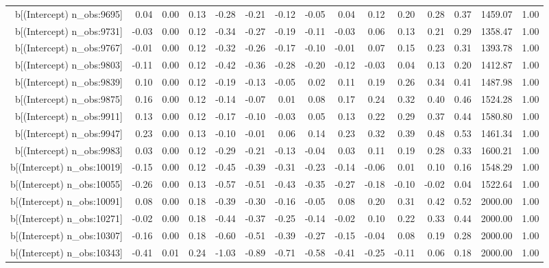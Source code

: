 \begin{table}[ht]
\begin{tabular}{rrrrrrrrrrrrrrr}
  b[(Intercept) n\_obs:9695] & 0.04 & 0.00 & 0.13 & -0.28 & -0.21 & -0.12 & -0.05 & 0.04 & 0.12 & 0.20 & 0.28 & 0.37 & 1459.07 & 1.00 \\ 
  b[(Intercept) n\_obs:9731] & -0.03 & 0.00 & 0.12 & -0.34 & -0.27 & -0.19 & -0.11 & -0.03 & 0.06 & 0.13 & 0.21 & 0.29 & 1358.47 & 1.00 \\ 
  b[(Intercept) n\_obs:9767] & -0.01 & 0.00 & 0.12 & -0.32 & -0.26 & -0.17 & -0.10 & -0.01 & 0.07 & 0.15 & 0.23 & 0.31 & 1393.78 & 1.00 \\ 
  b[(Intercept) n\_obs:9803] & -0.11 & 0.00 & 0.12 & -0.42 & -0.36 & -0.28 & -0.20 & -0.12 & -0.03 & 0.04 & 0.13 & 0.20 & 1412.87 & 1.00 \\ 
  b[(Intercept) n\_obs:9839] & 0.10 & 0.00 & 0.12 & -0.19 & -0.13 & -0.05 & 0.02 & 0.11 & 0.19 & 0.26 & 0.34 & 0.41 & 1487.98 & 1.00 \\ 
  b[(Intercept) n\_obs:9875] & 0.16 & 0.00 & 0.12 & -0.14 & -0.07 & 0.01 & 0.08 & 0.17 & 0.24 & 0.32 & 0.40 & 0.46 & 1524.28 & 1.00 \\ 
  b[(Intercept) n\_obs:9911] & 0.13 & 0.00 & 0.12 & -0.17 & -0.10 & -0.03 & 0.05 & 0.13 & 0.22 & 0.29 & 0.37 & 0.44 & 1580.80 & 1.00 \\ 
  b[(Intercept) n\_obs:9947] & 0.23 & 0.00 & 0.13 & -0.10 & -0.01 & 0.06 & 0.14 & 0.23 & 0.32 & 0.39 & 0.48 & 0.53 & 1461.34 & 1.00 \\ 
  b[(Intercept) n\_obs:9983] & 0.03 & 0.00 & 0.12 & -0.29 & -0.21 & -0.13 & -0.04 & 0.03 & 0.11 & 0.19 & 0.28 & 0.33 & 1600.21 & 1.00 \\ 
  b[(Intercept) n\_obs:10019] & -0.15 & 0.00 & 0.12 & -0.45 & -0.39 & -0.31 & -0.23 & -0.14 & -0.06 & 0.01 & 0.10 & 0.16 & 1548.29 & 1.00 \\ 
  b[(Intercept) n\_obs:10055] & -0.26 & 0.00 & 0.13 & -0.57 & -0.51 & -0.43 & -0.35 & -0.27 & -0.18 & -0.10 & -0.02 & 0.04 & 1522.64 & 1.00 \\ 
  b[(Intercept) n\_obs:10091] & 0.08 & 0.00 & 0.18 & -0.39 & -0.30 & -0.16 & -0.05 & 0.08 & 0.20 & 0.31 & 0.42 & 0.52 & 2000.00 & 1.00 \\ 
  b[(Intercept) n\_obs:10271] & -0.02 & 0.00 & 0.18 & -0.44 & -0.37 & -0.25 & -0.14 & -0.02 & 0.10 & 0.22 & 0.33 & 0.44 & 2000.00 & 1.00 \\ 
  b[(Intercept) n\_obs:10307] & -0.16 & 0.00 & 0.18 & -0.60 & -0.51 & -0.39 & -0.27 & -0.15 & -0.04 & 0.08 & 0.19 & 0.28 & 2000.00 & 1.00 \\ 
  b[(Intercept) n\_obs:10343] & -0.41 & 0.01 & 0.24 & -1.03 & -0.89 & -0.71 & -0.58 & -0.41 & -0.25 & -0.11 & 0.06 & 0.18 & 2000.00 & 1.00 \\ 

\end{tabular}
\end{table}
